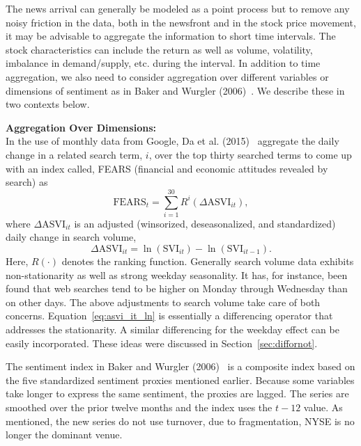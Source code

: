 The news arrival can generally be modeled as a point process but to remove any noisy friction in the data, both in the newsfront and in the stock price movement, it may be advisable to aggregate the information to short time intervals. The stock characteristics can include the return as well as volume, volatility, imbalance in demand/supply, etc. during the interval. In addition to time aggregation, we also need to consider aggregation over different variables or dimensions of sentiment as in Baker and Wurgler (2006)~\cite{baker2006investor}. We describe these in two contexts below. \twomedskip


\noindent\textbf{Aggregation Over Dimensions:} \\


In the use of monthly data from Google, Da et al. (2015)~\cite{da2015sum} aggregate the daily change in a related search term, $i$, over the top thirty searched terms to come up with an index called, FEARS (financial and economic attitudes revealed by search) as 
	\begin{equation} \label{eqn:fears}
	\text{FEARS}_t = \sum_{i=1}^{30} R^i (\Delta \text{ASVI}_{it}),
	\end{equation}
where $\Delta \text{ASVI}_{it}$ is an adjusted (winsorized, deseasonalized, and standardized) daily change in search volume, 
	\begin{equation} \label{eq:asvi_it_ln}
	\Delta \text{ASVI}_{it} = \ln(\text{SVI}_{it}) - \ln(\text{SVI}_{it-1}).
	\end{equation}
Here, $R(\cdot)$ denotes the ranking function. Generally search volume data exhibits non-stationarity as well as strong weekday seasonality. It has, for instance, been found that web searches tend to be higher on Monday through Wednesday than on other days. The above adjustments to search volume take care of both concerns. Equation~\ref{eq:asvi_it_ln} is essentially a differencing operator that addresses the stationarity. A similar differencing for the weekday effect can be easily incorporated. These ideas were discussed in Section~\ref{sec:diffornot}.


The sentiment index in Baker and Wurgler (2006)~\cite{baker2006investor} is a composite index based on the five standardized sentiment proxies mentioned earlier. Because some variables take longer to express the same sentiment, the proxies are lagged. The series are smoothed over the prior twelve months and the index uses the $t-12$ value. As mentioned, the new series do not use turnover, due to fragmentation, NYSE is no longer the dominant venue. 



